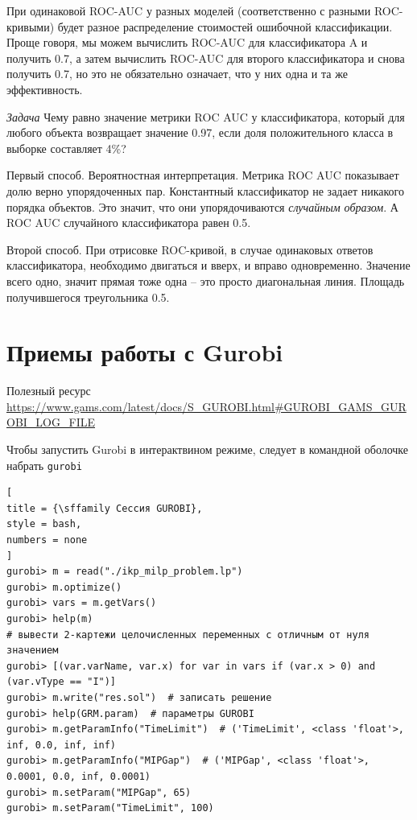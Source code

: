 \documentclass[%
	11pt,
	a4paper,
	utf8,
		]{article}
\begin{document}

При одинаковой ROC-AUC у разных моделей (соответственно с разными ROC-кривыми) будет разное распределение стоимостей ошибочной классификации. Проще говоря, мы можем вычислить ROC-AUC для классификатора A и получить 0.7, а затем вычислить ROC-AUC для второго классификатора и снова получить 0.7, но это не обязательно означает, что у них одна и та же эффективность.

\emph{Задача} Чему равно значение метрики ROC AUC у классификатора, который для любого объекта возвращает значение 0.97, если доля положительного класса в выборке составляет 4\%?

Первый способ. Вероятностная интерпретация. Метрика ROC AUC показывает долю верно упорядоченных пар. Константный классификатор не задает никакого порядка объектов. Это значит, что они упорядочиваются \emph{случайным образом}. А ROC AUC случайного классификатора равен 0.5.

Второй способ. При отрисовке ROC-кривой, в случае одинаковых ответов классификатора, необходимо двигаться и вверх, и вправо одновременно. Значение всего одно, значит прямая тоже одна -- это просто диагональная линия. Площадь получившегося треугольника 0.5.



\section{Приемы работы с Gurobi}

Полезный ресурс \url{https://www.gams.com/latest/docs/S_GUROBI.html#GUROBI_GAMS_GUROBI_LOG_FILE}

Чтобы запустить Gurobi в интерактвином режиме, следует в командной оболочке набрать \texttt{gurobi}
\begin{lstlisting}[
title = {\sffamily Сессия GUROBI},
style = bash,
numbers = none
]
gurobi> m = read("./ikp_milp_problem.lp")
gurobi> m.optimize()
gurobi> vars = m.getVars()
gurobi> help(m)
# вывести 2-картежи целочисленных переменных с отличным от нуля значением
gurobi> [(var.varName, var.x) for var in vars if (var.x > 0) and (var.vType == "I")]
gurobi> m.write("res.sol")  # записать решение
gurobi> help(GRM.param)  # параметры GUROBI
gurobi> m.getParamInfo("TimeLimit")  # ('TimeLimit', <class 'float'>, inf, 0.0, inf, inf)
gurobi> m.getParamInfo("MIPGap")  # ('MIPGap', <class 'float'>, 0.0001, 0.0, inf, 0.0001)
gurobi> m.setParam("MIPGap", 65)
gurobi> m.setParam("TimeLimit", 100)
\end{lstlisting}
\end{document}
